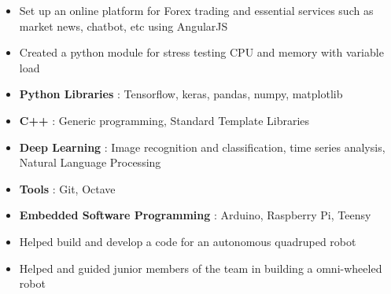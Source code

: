\documentclass[10pt,a4paper,ragged2e,withhyper]{altacv}
\begin{document}
\begin{paracol}{2}


\begin{itemize}
\item Set up an online platform for Forex trading and essential services such as market news, chatbot, etc using AngularJS
\item Created a python module for stress testing CPU and memory with variable load
\end{itemize}


\begin{itemize}
    \item \textbf{Python Libraries} : Tensorflow, keras, pandas, numpy, matplotlib
    \item \textbf{C++} : Generic programming, Standard Template Libraries
    \item \textbf{Deep Learning} : Image recognition and classification, time series analysis, Natural Language Processing
    \item \textbf{Tools} : Git, Octave
    \item \textbf{Embedded Software Programming} : Arduino, Raspberry Pi, Teensy
\end{itemize}

\begin{itemize}
    \item Helped build and develop a code for an autonomous quadruped robot
\end{itemize}

\divider

\begin{itemize}
    \item Helped and guided junior members of the team in building a omni-wheeled robot
\end{itemize}


\end{paracol}
\end{document}
